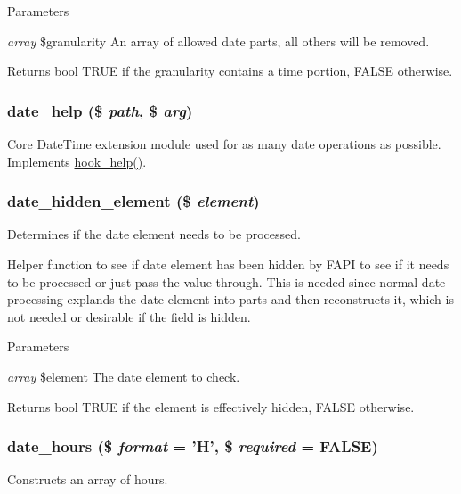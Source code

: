 \begin{DoxyParams}{Parameters}
\item[{\em array}]\$granularity An array of allowed date parts, all others will be removed.\end{DoxyParams}
\begin{DoxyReturn}{Returns}
bool TRUE if the granularity contains a time portion, FALSE otherwise. 
\end{DoxyReturn}
\hypertarget{date__api_8module_a21d6be4e94853aa99a0bf6db821ef5f8}{
\subsubsection[{date\_\-help}]{\setlength{\rightskip}{0pt plus 5cm}date\_\-help (\$ {\em path}, \/  \$ {\em arg})}}
\label{date__api_8module_a21d6be4e94853aa99a0bf6db821ef5f8}
Core DateTime extension module used for as many date operations as possible. Implements \hyperlink{group__hooks_ga5589c2714a782738e8851c4c90231f0e}{hook\_\-help()}. \hypertarget{date__api_8module_adf08b59d3645c530612349f108b4a45d}{
\subsubsection[{date\_\-hidden\_\-element}]{\setlength{\rightskip}{0pt plus 5cm}date\_\-hidden\_\-element (\$ {\em element})}}
\label{date__api_8module_adf08b59d3645c530612349f108b4a45d}
Determines if the date element needs to be processed.

Helper function to see if date element has been hidden by FAPI to see if it needs to be processed or just pass the value through. This is needed since normal date processing explands the date element into parts and then reconstructs it, which is not needed or desirable if the field is hidden.


\begin{DoxyParams}{Parameters}
\item[{\em array}]\$element The date element to check.\end{DoxyParams}
\begin{DoxyReturn}{Returns}
bool TRUE if the element is effectively hidden, FALSE otherwise. 
\end{DoxyReturn}
\hypertarget{date__api_8module_a1fcb343f239750316408995fb4ed6f88}{
\subsubsection[{date\_\-hours}]{\setlength{\rightskip}{0pt plus 5cm}date\_\-hours (\$ {\em format} = {\ttfamily 'H'}, \/  \$ {\em required} = {\ttfamily FALSE})}}
\label{date__api_8module_a1fcb343f239750316408995fb4ed6f88}
Constructs an array of hours.


